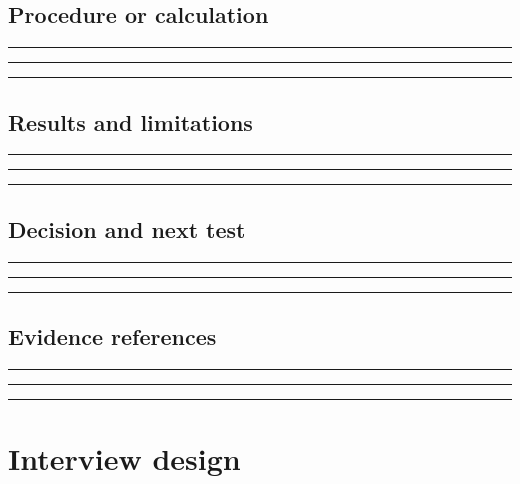 \documentclass[11pt]{article}
\begin{document}
\subsection{Procedure or calculation}
\noindent\rule{\linewidth}{0.35pt}\par\vspace{0.22in}
\noindent\rule{\linewidth}{0.35pt}\par\vspace{0.22in}
\noindent\rule{\linewidth}{0.35pt}\par\vspace{0.18in}

\subsection{Results and limitations}
\noindent\rule{\linewidth}{0.35pt}\par\vspace{0.22in}
\noindent\rule{\linewidth}{0.35pt}\par\vspace{0.22in}
\noindent\rule{\linewidth}{0.35pt}\par\vspace{0.18in}

\subsection{Decision and next test}
\noindent\rule{\linewidth}{0.35pt}\par\vspace{0.22in}
\noindent\rule{\linewidth}{0.35pt}\par\vspace{0.22in}
\noindent\rule{\linewidth}{0.35pt}\par\vspace{0.18in}

\subsection{Evidence references}
\noindent\rule{\linewidth}{0.35pt}\par\vspace{0.22in}
\noindent\rule{\linewidth}{0.35pt}\par\vspace{0.22in}
\noindent\rule{\linewidth}{0.35pt}\par\vspace{0.18in}
\clearpage

\section{Interview design}
\end{document}
